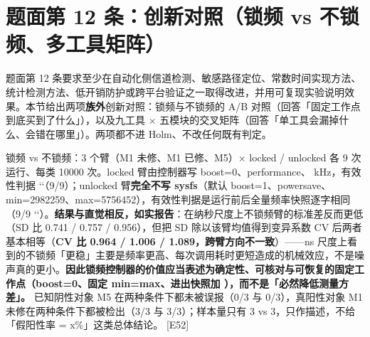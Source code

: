 \documentclass[UTF8,fontset=fandol,11pt,a4paper]{ctexart}
\begin{document}
\section{题面第 12 条：创新对照（锁频 vs 不锁频、多工具矩阵）}
题面第 12 条要求至少在自动化侧信道检测、敏感路径定位、常数时间实现方法、统计检测方法、低开销防护或跨平台验证之一取得改进，并用可复现实验说明效果。本节给出两项\textbf{族外}创新对照：锁频与不锁频的 A/B 对照（回答「固定工作点到底买到了什么」），以及九工具 \texorpdfstring{$\times$}{x} 五模块的交叉矩阵（回答「单工具会漏掉什么、会错在哪里」）。两项都不进 Holm、不改任何既有判定。


锁频 vs 不锁频：3 个臂（M1 未修、M1 已修、M5）\texorpdfstring{$\times$}{x} locked / unlocked 各 9 次运行、每类 10000 次。locked 臂由控制器写 boost=0、performance、\texttt{} kHz，有效性判据 `\texttt{}`（9/9）；unlocked 臂\textbf{完全不写 sysfs}（默认 boost=1、powersave、min=2982259、max=5756452），有效性判据是运行前后全量频率快照逐字相同（9/9 `\texttt{}`）。\textbf{结果与直觉相反，如实报告}：在纳秒尺度上不锁频臂的标准差反而更低（SD 比 0.741 / 0.757 / 0.956），但把 SD 除以该臂均值得到变异系数 CV 后两者基本相等（\textbf{CV 比 0.964 / 1.006 / 1.089，跨臂方向不一致}）——ns 尺度上看到的不锁频「更稳」主要是频率更高、每次调用耗时更短造成的机械效应，不是噪声真的更小。\textbf{因此锁频控制器的价值应当表述为确定性、可核对与可恢复的固定工作点（boost=0、固定 min=max、进出快照加 \texttt{}），而不是「必然降低测量方差」。} 已知阴性对象 M5 在两种条件下都未被误报（0/3 与 0/3），真阳性对象 M1 未修在两种条件下都被检出（3/3 与 3/3）；样本量只有 3 vs 3，只作描述，不给「假阳性率 = x\%」这类总体结论。 [E52]
\end{document}
